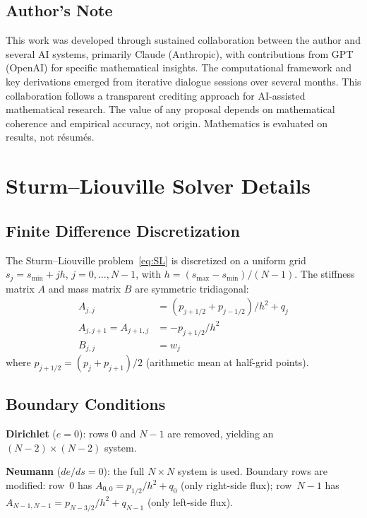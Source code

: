 \documentclass[11pt,a4paper]{article}
\theoremstyle{remark}
\begin{document}
\subsection*{Author's Note}

This work was developed through sustained collaboration between the author and
several AI systems, primarily Claude (Anthropic), with contributions from GPT (OpenAI)
for specific mathematical insights. The computational framework and key derivations
emerged from iterative dialogue sessions over several months. This collaboration
follows a transparent crediting approach for AI-assisted mathematical research. The
value of any proposal depends on mathematical coherence and empirical accuracy, not
origin. Mathematics is evaluated on results, not r\'esum\'es.

\appendix

\section{Sturm--Liouville Solver Details}

\subsection{Finite Difference Discretization}

The Sturm--Liouville problem~\eqref{eq:SL}
is discretized on a uniform grid $s_j = s_{\min} + jh$, $j = 0, \ldots, N-1$, with
$h = (s_{\max} - s_{\min})/(N - 1)$. The stiffness matrix $A$ and mass matrix $B$ are
symmetric tridiagonal:
\begin{align}
A_{j,j} &= (p_{j+1/2} + p_{j-1/2})/h^2 + q_j \\
A_{j,j+1} = A_{j+1,j} &= -p_{j+1/2}/h^2 \\
B_{j,j} &= w_j
\end{align}
where $p_{j+1/2} = (p_j + p_{j+1})/2$ (arithmetic mean at half-grid points).

\subsection{Boundary Conditions}

\textbf{Dirichlet} ($e = 0$): rows 0 and $N-1$ are removed, yielding an $(N-2) \times (N-2)$ system.

\textbf{Neumann} ($de/ds = 0$): the full $N \times N$ system is used. Boundary rows are modified:
row~0 has $A_{0,0} = p_{1/2}/h^2 + q_0$ (only right-side flux);
row~$N-1$ has $A_{N-1,N-1} = p_{N-3/2}/h^2 + q_{N-1}$ (only left-side flux).
\end{document}
